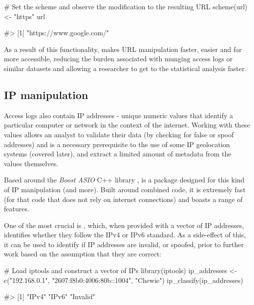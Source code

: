 \begin{Schunk}
\begin{Sinput}
# Set the scheme and observe the modification to the resulting URL
scheme(url) <- "https"
url
\end{Sinput}
\begin{Soutput}
#> [1] "https://www.google.com/"
\end{Soutput}
\end{Schunk}

As a result of this functionality,  makes URL manipulation
faster, easier and far more accessible, reducing the burden associated
with munging access logs or similar datasets and allowing a researcher
to get to the statistical analysis faster.

\subsection{IP manipulation}\label{ip-manipulation}

Access logs also contain IP addresses - unique numeric values that
identify a particular computer or network in the context of the
internet. Working with these values allows an analyst to validate their
data (by checking for false or spoof addresses) and is a necessary
prerequisite to the use of some IP geolocation systems (covered later),
and extract a limited amount of metadata from the values themselves.

Based around the \emph{Boost ASIO} C++ library \citep{boostcite},
 \citep{iptools} is a package designed for this kind of
IP manipulation (and more). Built around combined code, it is extremely
fast (for that code that does not rely on internet connections) and
boasts a range of features.

One of the most crucial is , which, when provided
with a vector of IP addresses, identifies whether they follow the IPv4
or IPv6 standard. As a side-effect of this, it can be used to identify
if IP addresses are invalid, or spoofed, prior to further work based on
the assumption that they are correct:

\begin{Schunk}
\begin{Sinput}
# Load iptools and construct a vector of IPs
library(iptools)
ip_addresses <- c("192.168.0.1", "2607:f8b0:4006:80b::1004", "Chewie")
ip_classify(ip_addresses)
\end{Sinput}
\begin{Soutput}
#> [1] "IPv4"    "IPv6"    "Invalid"
\end{Soutput}
\end{Schunk}

